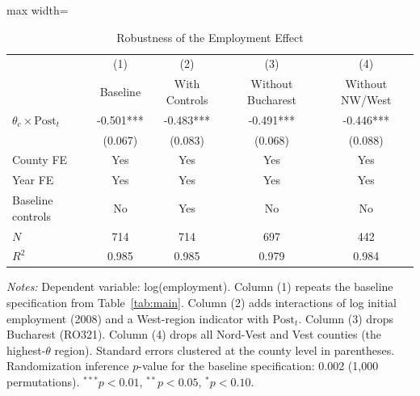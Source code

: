 \begin{table}[htbp]
\centering
\caption{Robustness of the Employment Effect}
\label{tab:robust}
\begin{adjustbox}{max width=\textwidth}
\begin{tabular}{lcccc}
\toprule
 & (1) & (2) & (3) & (4) \\
 & Baseline & With Controls & Without Bucharest & Without NW/West \\
\midrule
$\theta_c \times \text{Post}_{t}$ & -0.501*** & -0.483*** & -0.491*** & -0.446*** \\
 & (0.067) & (0.083) & (0.068) & (0.088) \\
\addlinespace
County FE & Yes & Yes & Yes & Yes \\
Year FE & Yes & Yes & Yes & Yes \\
Baseline controls & No & Yes & No & No \\
$N$ & 714 & 714 & 697 & 442 \\
$R^2$ & 0.985 & 0.985 & 0.979 & 0.984 \\
\bottomrule
\end{tabular}
\end{adjustbox}
\begin{flushleft}\small
\textit{Notes:} Dependent variable: log(employment). Column (1) repeats the baseline specification from Table~\ref{tab:main}. Column (2) adds interactions of log initial employment (2008) and a West-region indicator with $\text{Post}_t$. Column (3) drops Bucharest (RO321). Column (4) drops all Nord-Vest and Vest counties (the highest-$\theta$ region). Standard errors clustered at the county level in parentheses. Randomization inference $p$-value for the baseline specification: 0.002 (1,000 permutations). $^{***}p<0.01$, $^{**}p<0.05$, $^{*}p<0.10$.
\end{flushleft}
\end{table}
